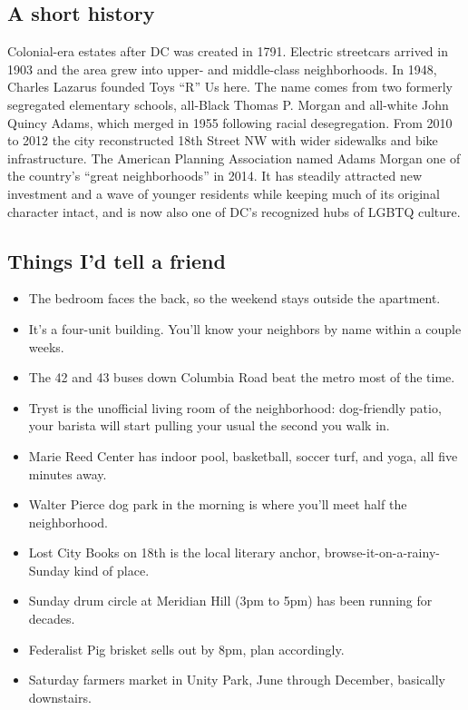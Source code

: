 \documentclass[11pt,a4paper]{article}
\begin{document}
\subsection*{A short history}

Colonial-era estates after DC was created in 1791. Electric streetcars arrived in 1903 and the area grew into upper- and middle-class neighborhoods. In 1948, Charles Lazarus founded Toys ``R'' Us here. The name comes from two formerly segregated elementary schools, all-Black Thomas P. Morgan and all-white John Quincy Adams, which merged in 1955 following racial desegregation. From 2010 to 2012 the city reconstructed 18th Street NW with wider sidewalks and bike infrastructure. The American Planning Association named Adams Morgan one of the country's ``great neighborhoods'' in 2014. It has steadily attracted new investment and a wave of younger residents while keeping much of its original character intact, and is now also one of DC's recognized hubs of LGBTQ culture.

\subsection*{Things I'd tell a friend}

\begin{itemize}[leftmargin=1.2em,nosep,after=\strut]
\item The bedroom faces the back, so the weekend stays outside the apartment.
\item It's a four-unit building. You'll know your neighbors by name within a couple weeks.
\item The 42 and 43 buses down Columbia Road beat the metro most of the time.
\item Tryst is the unofficial living room of the neighborhood: dog-friendly patio, your barista will start pulling your usual the second you walk in.
\item Marie Reed Center has indoor pool, basketball, soccer turf, and yoga, all five minutes away.
\item Walter Pierce dog park in the morning is where you'll meet half the neighborhood.
\item Lost City Books on 18th is the local literary anchor, browse-it-on-a-rainy-Sunday kind of place.
\item Sunday drum circle at Meridian Hill (3pm to 5pm) has been running for decades.
\item Federalist Pig brisket sells out by 8pm, plan accordingly.
\item Saturday farmers market in Unity Park, June through December, basically downstairs.
\end{itemize}
\end{document}
